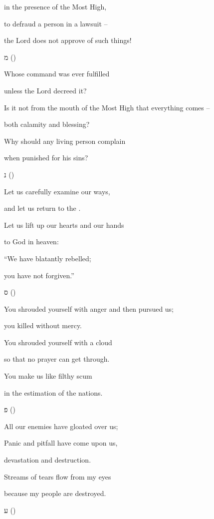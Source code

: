 {\par }{\Q in
the presence
of the Most High,
\par }{\Q {}to defraud
a person
in a lawsuit
–
\par }{\Q the Lord
does not
approve of such things!
\par }{\SH מ ({})
\par }{\Q {}Whose command was ever fulfilled
\par }{\Q unless the Lord decreed it?
\par }{\Q {}Is it
not
from the mouth
of the Most
High that everything comes –
\par }{\Q both calamity and blessing?
\par }{\Q {}Why
should any living
person
complain
\par }{\Q when punished for his sins?
\par }{\SH נ ({})
\par }{\Q {}Let us carefully examine our ways,
\par }{\Q and let us return to the
{}.
\par }{\Q {}Let us
lift
up our hearts
and our hands
\par }{\Q to
God
in heaven:
\par }{\Q {}“We have blatantly
rebelled;
\par }{\Q you
have not
forgiven.”
\par }{\SH ס ({})
\par }{\Q {}You shrouded yourself with anger and then pursued us;
\par }{\Q you killed without mercy.
\par }{\Q {}You shrouded
yourself with a cloud
\par }{\Q so that no prayer
can get through.
\par }{\Q {}You make
us like filthy scum
\par }{\Q in the estimation
of the nations.
\par }{\SH פ ({})
\par }{\Q {}All our enemies have gloated over us;
\par }{\Q {}Panic
and pitfall
have come
upon us,
\par }{\Q devastation
and destruction.
\par }{\Q {}Streams
of tears
flow
from my eyes
\par }{\Q because my people
are destroyed.
\par }{\SH ע ({})
}
